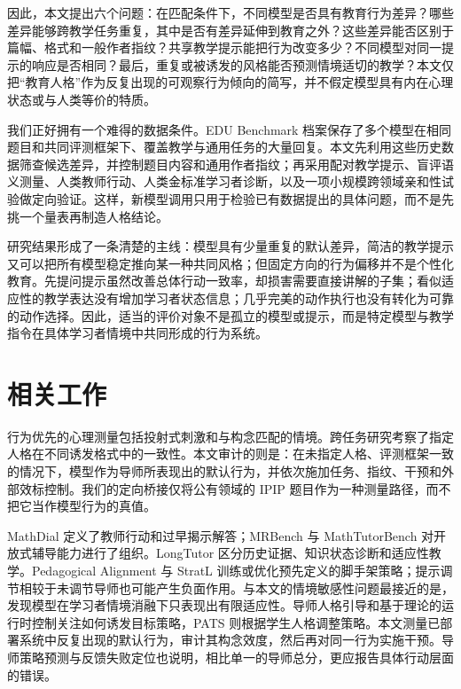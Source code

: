 \documentclass[11pt,a4paper,UTF8]{ctexart}
\begin{document}
因此，本文提出六个问题：在匹配条件下，不同模型是否具有教育行为差异？哪些差异能够跨教学任务重复，其中是否有差异延伸到教育之外？这些差异能否区别于篇幅、格式和一般作者指纹？共享教学提示能把行为改变多少？不同模型对同一提示的响应是否相同？最后，重复或被诱发的风格能否预测情境适切的教学？本文仅把“教育人格”作为反复出现的可观察行为倾向的简写，并不假定模型具有内在心理状态或与人类等价的特质。

我们正好拥有一个难得的数据条件。EDU Benchmark 档案保存了多个模型在相同题目和共同评测框架下、覆盖教学与通用任务的大量回复。本文先利用这些历史数据筛查候选差异，并控制题目内容和通用作者指纹；再采用配对教学提示、盲评语义测量、人类教师行动、人类金标准学习者诊断，以及一项小规模跨领域亲和性试验做定向验证。这样，新模型调用只用于检验已有数据提出的具体问题，而不是先挑一个量表再制造人格结论。

研究结果形成了一条清楚的主线：模型具有少量重复的默认差异，简洁的教学提示又可以把所有模型稳定推向某一种共同风格；但固定方向的行为偏移并不是个性化教育。先提问提示虽然改善总体行动一致率，却损害需要直接讲解的子集；看似适应性的教学表达没有增加学习者状态信息；几乎完美的动作执行也没有转化为可靠的动作选择。因此，适当的评价对象不是孤立的模型或提示，而是特定模型与教学指令在具体学习者情境中共同形成的行为系统。

\section{相关工作}

行为优先的心理测量包括投射式刺激和与构念匹配的情境\citep{wang-etal-2026-genpt,kocielnik-etal-2026-rethinking}。跨任务研究考察了指定人格在不同诱发格式中的一致性\citep{reusens-etal-2025-persona-consistency}。本文审计的则是：在未指定人格、评测框架一致的情况下，模型作为导师所表现出的默认行为，并依次施加任务、指纹、干预和外部效标控制。我们的定向桥接仅将公有领域的 IPIP 题目\citep{goldberg-etal-2006-ipip}作为一种测量路径，而不把它当作模型行为的真值。

MathDial 定义了教师行动和过早揭示解答\citep{macina-etal-2023-mathdial}；MRBench 与 MathTutorBench 对开放式辅导能力进行了组织\citep{maurya-etal-2025-mrbench,macina-etal-2025-mathtutorbench}。LongTutor 区分历史证据、知识状态诊断和适应性教学\citep{li-etal-2026-longtutor}。Pedagogical Alignment 与 StratL 训练或优化预先定义的脚手架策略\citep{sonkar-etal-2024-pedagogical,puech-etal-2025-steering}；提示调节相较于未调节导师也可能产生负面作用\citep{steindl-etal-2025-prompt}。与本文的情境敏感性问题最接近的是，\citet{borchers-shou-2025-adaptivity}发现模型在学习者情境消融下只表现出有限适应性。导师人格引导\citep{lee-etal-2026-tutor-personas}和基于理论的运行时控制\citep{nkambou-etal-2026-pedrag}关注如何诱发目标策略，PATS 则根据学生人格调整策略\citep{rooein-etal-2026-pats}。本文测量已部署系统中反复出现的默认行为，审计其构念效度，然后再对同一行为实施干预。导师策略预测\citep{ikram-etal-2025-strategy}与反馈失败定位\citep{yasir-etal-2026-feedback}也说明，相比单一的导师总分，更应报告具体行动层面的错误。
\end{document}
